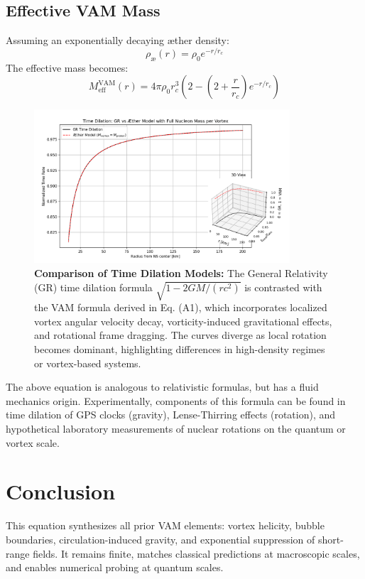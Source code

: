 \subsection{Effective VAM Mass}
Assuming an exponentially decaying æther density:
\[
\rho_\text{\ae}(r) = \rho_0 e^{-r / r_c}
\]
The effective mass becomes:
\[
M_\text{eff}^\text{VAM}(r) = 4\pi \rho_0 r_c^3 \left(2 - \left(2 + \frac{r}{r_c} \right) e^{-r/r_c} \right)
\]

\begin{figure}[H]
  \centering
  \includegraphics[width=0.85\textwidth]{images/07-TimeDilationGRVsVAM}
  \caption{
  \textbf{Comparison of Time Dilation Models:} The General Relativity (GR) time dilation formula \(\sqrt{1 - 2GM/(rc^2)}\) is contrasted with the VAM formula derived in Eq. (A1), which incorporates localized vortex angular velocity decay, vorticity-induced gravitational effects, and rotational frame dragging. The curves diverge as local rotation becomes dominant, highlighting differences in high-density regimes or vortex-based systems.
  }
  \label{fig:GRvsVAMTimeDilation}
\end{figure}



The above equation is analogous to relativistic formulas, but has a fluid mechanics origin. Experimentally, components of this formula can be found in time dilation of GPS clocks (gravity), Lense-Thirring effects (rotation), and hypothetical laboratory measurements of nuclear rotations on the quantum or vortex scale.

\section*{Conclusion}
This equation synthesizes all prior VAM elements: vortex helicity, bubble boundaries, circulation-induced gravity, and exponential suppression of short-range fields. It remains finite, matches classical predictions at macroscopic scales, and enables numerical probing at quantum scales.

